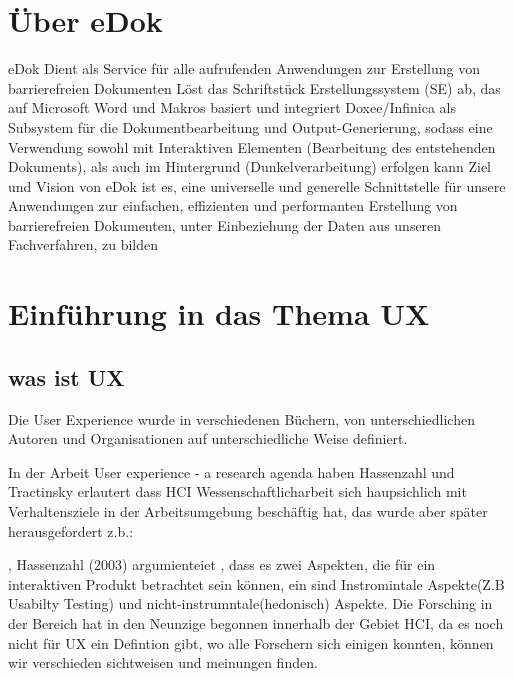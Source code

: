 \documentclass[12pt,oneside]{article}
\begin{document}
\section{Über eDok}
   
eDok Dient als Service für alle aufrufenden Anwendungen zur Erstellung von barrierefreien Dokumenten
Löst das Schriftstück Erstellungssystem (SE) ab, das auf Microsoft Word und Makros basiert und integriert Doxee/Infinica als Subsystem für die Dokumentbearbeitung und Output-Generierung, sodass eine Verwendung sowohl mit Interaktiven Elementen (Bearbeitung des entstehenden Dokuments), als auch im Hintergrund (Dunkelverarbeitung) erfolgen kann
Ziel und Vision von eDok ist es, eine universelle und generelle Schnittstelle für unsere Anwendungen zur einfachen, effizienten und performanten Erstellung von barrierefreien Dokumenten, unter Einbeziehung der Daten aus unseren Fachverfahren, zu bilden
\section{Einführung in das Thema UX}
 
\subsection{was ist UX}
Die User Experience wurde in verschiedenen Büchern, von unterschiedlichen Autoren und Organisationen auf unterschiedliche Weise definiert. \cite{GOISTAI}

In der Arbeit  User experience - a research agenda haben Hassenzahl und Tractinsky\cite{research} erlautert dass HCI  Wessenschaftlicharbeit sich haupsichlich mit Verhaltensziele in der Arbeitsumgebung beschäftig hat, das wurde aber später herausgefordert z.b.: 

\cite{research}
, Hassenzahl (2003)   argumienteiet , dass es zwei Aspekten, die für ein interaktiven Produkt betrachtet sein können, ein sind Instromintale Aspekte(Z.B Usabilty Testing) und nicht-instrumntale(hedonisch)  Aspekte.
Die Forsching in der Bereich hat in den Neunzige begonnen innerhalb der Gebiet HCI, da es noch nicht für UX ein Defintion gibt, wo alle Forschern sich einigen konnten, können wir 
verschieden sichtweisen und meinungen finden\cite{glanznig}.
\end{document}
